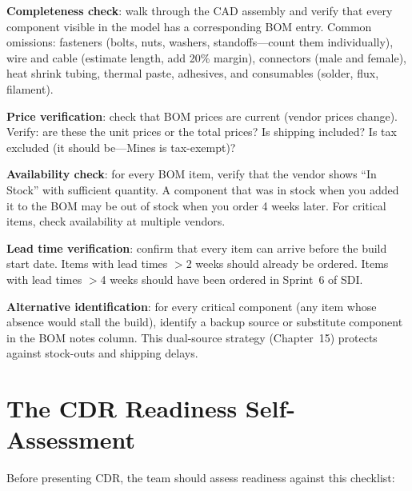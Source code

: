 \textbf{Completeness check}: walk through the CAD assembly and verify that every component visible in the model has a corresponding BOM entry. Common omissions: fasteners (bolts, nuts, washers, standoffs---count them individually), wire and cable (estimate length, add 20\% margin), connectors (male and female), heat shrink tubing, thermal paste, adhesives, and consumables (solder, flux, filament).

\textbf{Price verification}: check that BOM prices are current (vendor prices change). Verify: are these the unit prices or the total prices? Is shipping included? Is tax excluded (it should be---Mines is tax-exempt)?

\textbf{Availability check}: for every BOM item, verify that the vendor shows ``In Stock'' with sufficient quantity. A component that was in stock when you added it to the BOM may be out of stock when you order 4 weeks later. For critical items, check availability at multiple vendors.

\textbf{Lead time verification}: confirm that every item can arrive before the build start date. Items with lead times $>$2 weeks should already be ordered. Items with lead times $>$4 weeks should have been ordered in Sprint~6 of SDI.

\textbf{Alternative identification}: for every critical component (any item whose absence would stall the build), identify a backup source or substitute component in the BOM notes column. This dual-source strategy (Chapter~15) protects against stock-outs and shipping delays.

\section{The CDR Readiness Self-Assessment}
Before presenting CDR, the team should assess readiness against this checklist:

